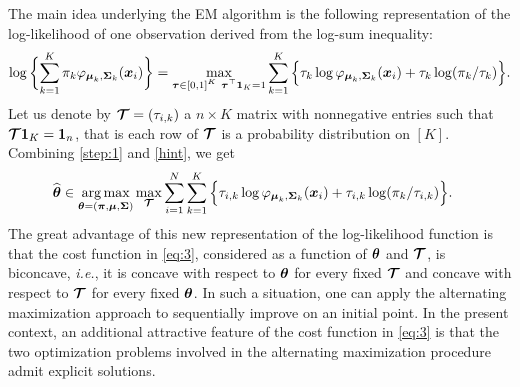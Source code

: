 The main idea underlying the EM algorithm is the following representation of the log-likelihood
of one observation derived from the log-sum inequality:
\begin{equation}\label{hint}
\log\bigg\{{\sum_{k=1}^K\pi_k\varphi_{\bmu_{k},\bSigma_{k}}(\bx_i)}\bigg\} =
\max_{\substack{\btau\in[0,1]^K \ \btau^\top \b1_K=1}} \sum_{k=1}^K \Big\{\tau_{k}\log\varphi_{\bmu_{k},\bSigma_{k}}(\bx_i)+\tau_{k} \log(\pi_k/\tau_{k})\Big\}.
\end{equation}
Let us denote by $\boldsymbol{\mathcal T} = (\tau_{i,k})$ a $n\times K$ matrix with nonnegative entries such that $\bTau\b1_K = \b1_n$, that is each
row of $\boldsymbol{\mathcal T}$ is a probability distribution on $[K]$. Combining \eqref{step:1} and \eqref{hint}, we get
\begin{align}\label{eq:3}
\widehat{{\boldsymbol\theta}}
    &\in\operatorname*{arg\,max}_{{\boldsymbol\theta}=(\boldsymbol \pi,\boldsymbol\mu,\boldsymbol\Sigma)}\max_{\boldsymbol{\mathcal T}}
    \sum_{i=1}^{N} \sum_{k=1}^K \Big\{\tau_{i,k}\log\varphi_{\boldsymbol\mu_{k},\boldsymbol\Sigma_{k}}(\boldsymbol x_i)+\tau_{i,k}
    \log(\pi_k/\tau_{i,k})\Big\}.
\end{align}
The great advantage of this new representation of the log-likelihood function is that the cost
function in \eqref{eq:3}, considered as a function of ${\boldsymbol\theta}$ and $\boldsymbol{\mathcal T}$, is biconcave, \textit{i.e.},
it is concave with respect to ${\boldsymbol\theta}$ for every fixed $\boldsymbol{\mathcal T}$ and concave with respect to $\boldsymbol{\mathcal T}$ for
every fixed ${\boldsymbol\theta}$. In such a situation, one can apply the alternating maximization approach to sequentially
improve on an initial point. In the present context, an additional attractive feature of the cost function
in \eqref{eq:3} is that the two optimization problems involved in the alternating maximization procedure
admit explicit solutions.

